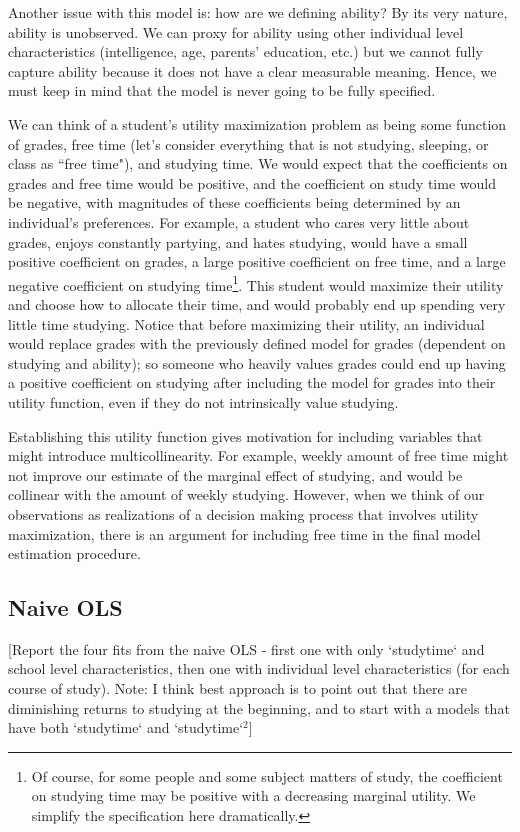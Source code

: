 \documentclass[12pt]{article}
\begin{document}
Another issue with this model is: how are we defining ability? By its very nature, ability is unobserved. We can proxy for ability using other individual level characteristics (intelligence, age, parents' education, etc.) but we cannot fully capture ability because it does not have a clear measurable meaning. Hence, we must keep in mind that the model is never going to be fully specified.

We can think of a student's utility maximization problem as being some function of grades, free time (let's consider everything that is not studying, sleeping, or class as ``free time"), and studying time. We would expect that the coefficients on grades and free time would be positive, and the coefficient on study time would be negative, with magnitudes of these coefficients being determined by an individual's preferences. For example, a student who cares very little about grades, enjoys constantly partying, and hates studying, would have a small positive coefficient on grades, a large positive coefficient on free time, and a large negative coefficient on studying time\footnote{Of course, for some people and some subject matters of study, the coefficient on studying time may be positive with a decreasing marginal utility. We simplify the specification here dramatically.}. This student would maximize their utility and choose how to allocate their time, and would probably end up spending very little time studying. Notice that before maximizing their utility, an individual would replace grades with the previously defined model for grades (dependent on studying and ability); so someone who heavily values grades could end up having a positive coefficient on studying after including the model for grades into their utility function, even if they do not intrinsically value studying.

Establishing this utility function gives motivation for including variables that might introduce multicollinearity. For example, weekly amount of free time might not improve our estimate of the marginal effect of studying, and would be collinear with the amount of weekly studying. However, when we think of our observations as realizations of a decision making process that involves utility maximization, there is an argument for including free time in the final model estimation procedure.


\subsection{Naive OLS}
\textcolor{BrickRed}{[Report the four fits from the naive OLS - first one with only `studytime` and school level characteristics, then one with individual level characteristics (for each course of study). Note: I think best approach is to point out that there are diminishing returns to studying at the beginning, and to start with a models that have both `studytime` and `studytime`$^2$]}
\end{document}
